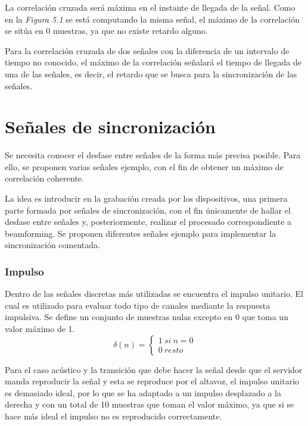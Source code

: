 \documentclass[a4paper,11pt]{book}
\begin{document}
La correlación cruzada será máxima en el instante de llegada de la señal. Como en la \textit{Figura 5.1} se está computando la misma señal, el máximo de la correlación se sitúa en 0 muestras, ya que no existe retardo alguno.

Para la correlación cruzada de dos señales con la diferencia de un intervalo de tiempo no conocido, el máximo de la correlación señalará el tiempo de llegada de una de las señales, es decir, el retardo que se busca para la sincronización de las señales.

\section{Señales de sincronización}
Se necesita conocer el desfase entre señales de la forma más precisa posible. Para ello, se proponen varias señales ejemplo, con el fin de obtener un máximo de correlación coherente.

La idea es introducir en la grabación creada por los dispositivos, una primera parte formada por señales de sincronización, con el fin únicamente de hallar el desfase entre señales y, posteriormente, realizar el procesado correspondiente a beamforming. Se proponen diferentes señales ejemplo para implementar la sincronización comentada.

\subsubsection{Impulso}
Dentro de las señales discretas más utilizadas se encuentra el impulso unitario. El cual es utilizado para evaluar todo tipo de canales mediante la respuesta impulsiva. Se define un conjunto de muestras nulas excepto en 0 que toma un valor máximo de 1.
\[
\delta(n)=\left\lbrace\begin{array}{c} 1~si~n = 0 \\ 0~resto \end{array}\right.\]

Para el caso acústico y la transición que debe hacer la señal desde que el servidor manda reproducir la señal y esta se reproduce por el altavoz, el impulso unitario es demasiado ideal, por lo que se ha adaptado a un impulso desplazado a la derecha y con un total de 10 muestras que toman el valor máximo, ya que si se hace más ideal el impulso no es reproducido correctamente.
\end{document}
